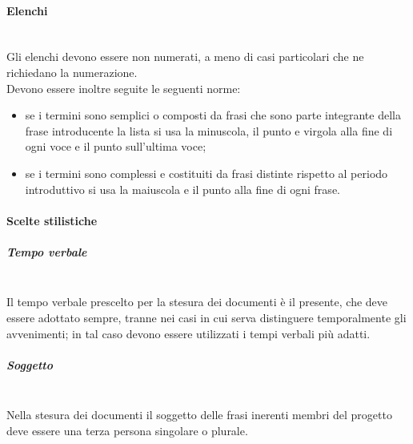 \paragraph{Elenchi}\mbox{}\\
Gli elenchi devono essere non numerati, a meno di casi particolari che ne richiedano la numerazione.\\
Devono essere inoltre seguite le seguenti norme:
\begin{itemize}
	\item se i termini sono semplici o composti da frasi che sono parte integrante della frase introducente la lista si usa la minuscola, il punto e virgola alla fine di ogni voce e il punto sull'ultima voce;
	\item se i termini sono complessi e costituiti da frasi distinte rispetto al periodo introduttivo si usa la maiuscola e il punto alla fine di ogni frase.
\end{itemize}

\paragraph{Scelte stilistiche}\mbox{}

\subparagraph{Tempo verbale} \mbox{} \\
Il tempo verbale prescelto per la stesura dei documenti è il presente, che deve essere adottato sempre, tranne nei casi in cui serva distinguere temporalmente gli avvenimenti; in tal caso devono essere utilizzati i tempi verbali più adatti.

\subparagraph{Soggetto} \mbox{} \\
Nella stesura dei documenti il soggetto delle frasi inerenti membri del progetto deve essere una terza persona singolare o plurale.

